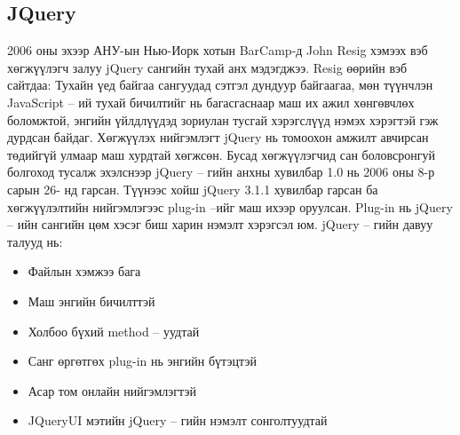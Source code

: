 \subsection{JQuery}
2006 оны эхээр АНУ-ын Нью-Иорк хотын BarCamp-д John Resig хэмээх вэб хөгжүүлэгч залуу jQuery сангийн тухай анх мэдэгджээ. Resig өөрийн вэб сайтдаа: Тухайн үед байгаа сангуудад сэтгэл дундуур байгаагаа, мөн түүнчлэн JavaScript – ий тухай бичилтийг нь багасгаснаар маш их ажил хөнгөвчлөх боломжтой, энгийн үйлдлүүдэд зориулан тусгай хэрэгслүүд нэмэх хэрэгтэй гэж дурдсан байдаг.
Хөгжүүлэх нийгэмлэгт jQuery нь томоохон амжилт авчирсан төдийгүй улмаар маш хурдтай хөгжсөн. Бусад хөгжүүлэгчид сан боловсронгуй болгоход тусалж эхэлснээр jQuery – гийн анхны хувилбар 1.0 нь 2006 оны 8-р сарын 26- нд гарсан.
Түүнээс хойш jQuery 3.1.1 хувилбар гарсан ба хөгжүүлэлтийн нийгэмлэгээс plug-in –ийг маш ихээр оруулсан. Plug-in нь jQuery – ийн сангийн цөм хэсэг биш харин нэмэлт хэрэгсэл юм. 
jQuery – гийн давуу талууд нь:
\begin{itemize}
\item Файлын хэмжээ бага
\item Маш энгийн бичилттэй
\item Холбоо бүхий method – уудтай
\item Санг өргөтгөх plug-in нь энгийн бүтэцтэй
\item Асар том онлайн нийгэмлэгтэй
\item JQueryUI мэтийн jQuery – гийн нэмэлт сонголтуудтай
\end{itemize}


